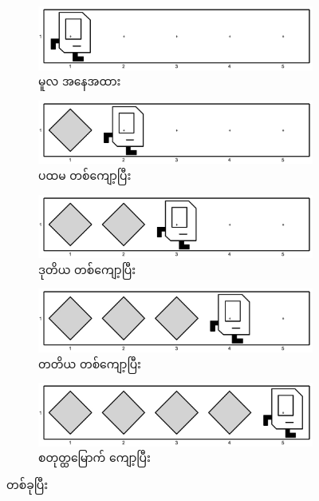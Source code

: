 \begin{sloppypar}
\begin{figure}[tbh!]
    \begin{subfigure}[t]{0.8\textwidth}
        \includegraphics[scale=0.2, left]{ch02/MakeRowOfFiveBeepers/init.jpg}
        \caption{မူလ အနေအထား}    
    \end{subfigure}
    \begin{subfigure}[t]{0.8\textwidth}
        \includegraphics[scale=0.2, left]{ch02/MakeRowOfFiveBeepers/1st_iter.jpg}
        \caption{ပထမ တစ်ကျော့ပြီး}    
    \end{subfigure}
    \begin{subfigure}[t]{0.8\textwidth}
        \includegraphics[scale=0.2, left]{ch02/MakeRowOfFiveBeepers/2nd_iter.jpg}
        \caption{ဒုတိယ တစ်ကျော့ပြီး}    
    \end{subfigure}
    \begin{subfigure}[t]{0.8\textwidth}
        \includegraphics[scale=0.2, left]{ch02/MakeRowOfFiveBeepers/3rd_iter.jpg}
        \caption{တတိယ တစ်ကျော့ပြီး}    
    \end{subfigure}
    \begin{subfigure}[t]{0.8\textwidth}
        \includegraphics[scale=0.2, left]{ch02/MakeRowOfFiveBeepers/4th_iter.jpg}
        \caption{စတုတ္ထမြောက် ကျော့ပြီး}    
    \end{subfigure}
    \caption{\mmiteration တစ်ခုပြီး}
    \label{fig:MakeRowOfFiveBeepersIters}
\end{figure}


\end{sloppypar}
